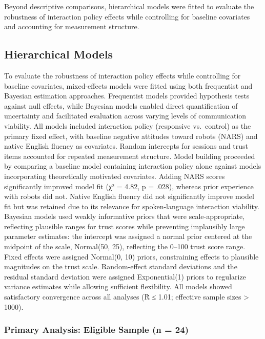 \documentclass[
  letterpaper,
  DIV=11,
  numbers=noendperiod]{scrartcl}
\begin{document}
Beyond descriptive comparisons, hierarchical models were fitted to
evaluate the robustness of interaction policy effects while controlling
for baseline covariates and accounting for measurement structure.

\subsection{Hierarchical Models}\label{hierarchical-models}

To evaluate the robustness of interaction policy effects while
controlling for baseline covariates, mixed-effects models were fitted
using both frequentist and Bayesian estimation approaches. Frequentist
models provided hypothesis tests against null effects, while Bayesian
models enabled direct quantification of uncertainty and facilitated
evaluation across varying levels of communication viability. All models
included interaction policy (responsive vs.~control) as the primary
fixed effect, with baseline negative attitudes toward robots (NARS) and
native English fluency as covariates. Random intercepts for sessions and
trust items accounted for repeated measurement structure. Model building
proceeded by comparing a baseline model containing interaction policy
alone against models incorporating theoretically motivated covariates.
Adding NARS scores significantly improved model fit (χ² = 4.82, p =
.028), whereas prior experience with robots did not. Native English
fluency did not significantly improve model fit but was retained due to
its relevance for spoken-language interaction viability. Bayesian models
used weakly informative priors that were scale-appropriate, reflecting
plausible ranges for trust scores while preventing implausibly large
parameter estimates: the intercept was assigned a normal prior centered
at the midpoint of the scale, Normal(50, 25), reflecting the 0--100
trust score range. Fixed effects were assigned Normal(0, 10) priors,
constraining effects to plausible magnitudes on the trust scale.
Random-effect standard deviations and the residual standard deviation
were assigned Exponential(1) priors to regularize variance estimates
while allowing sufficient flexibility. All models showed satisfactory
convergence across all analyses (R̂ ≤ 1.01; effective sample sizes
\textgreater{} 1000).

\subsubsection{Primary Analysis: Eligible Sample (n =
24)}\label{primary-analysis-eligible-sample-n-24}
\end{document}
